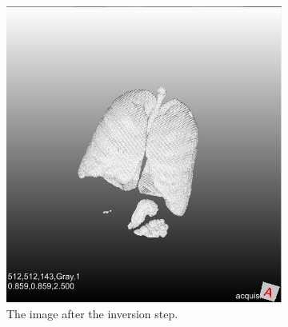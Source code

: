 \documentclass[a4paper,10pt]{article}
\numberwithin{equation}{section} %
\numberwithin{figure}{section} %
\numberwithin{table}{section} %
\begin{document}
\begin{figure}[h]
    ~ %
    \begin{subfigure}[b]{0.45\textwidth}
        \includegraphics[width=\textwidth]{lungs_with_meuk}
        \caption{The image after the inversion step.}
        \label{fig:lung-meuk}
    \end{subfigure}
    ~ %
    \begin{subfigure}[b]{0.45\textwidth}

\end{subfigure}
\end{figure}
\end{document}
